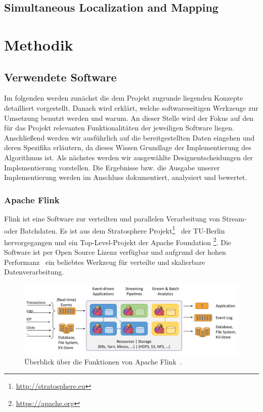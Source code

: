 \documentclass[11pt]{article}
\begin{document}
\subsection{Simultaneous Localization and Mapping}

\section{Methodik}\label{Methodik}
\subsection{Verwendete Software}
Im folgenden werden zunächst die dem Projekt zugrunde liegenden Konzepte detailliert vorgestellt. Danach wird erklärt, welche softwareseitigen Werk\-zeu\-ge zur Umsetzung benutzt werden und warum. An dieser Stelle wird der Fokus auf den für das Projekt relevanten Funktionalitäten der jeweiligen Software liegen. Anschließend werden wir ausführlich auf die bereitgestellten Daten eingehen und deren Spezifika erläutern, da dieses Wissen Grundlage der Implementierung des Algorithmus ist. Als nächstes werden wir ausgewählte Designentscheidungen der Implementierung vorstellen. Die Ergebnisse bzw. die Ausgabe unserer Implementierung werden im Anschluss dokumentiert, analysiert und bewertet.

\subsubsection{Apache Flink}
Flink ist eine Software zur verteilten und parallelen Verarbeitung von Stream- oder Batch\-daten. Es ist aus dem Stratosphere Projekt\footnote{\url{http://stratosphere.eu}}~\cite{alexandrov_stratosphere_2014} der TU-Berlin hervorgegangen und ein Top-Level-Projekt der Apache Foundation \footnote{\url{https://apache.org}}. Die Software ist per Open Source Lizenz verfügbar und aufgrund der hohen Performanz~\cite{alexandrov_stratosphere_2014} ein beliebtes Werkzeug für verteilte und skalierbare Datenverarbeitung.

\begin{figure}[!t]
	\centering
	\includegraphics[width=5.5in]{flink-home-graphic.png}
	\caption{Überblick über die Funktionen von Apache Flink~\cite{Flink-Overview-Link}.}
	\label{Flink-Überblick}
\end{figure}
\end{document}
